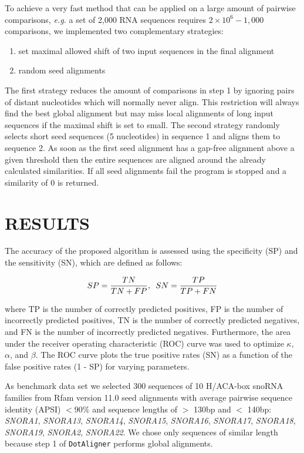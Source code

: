 \documentclass[a4paper,twoside]{article}
\newcommand\dotaligner{\texttt{DotAligner}}
\newcommand\eg{\textit{e.g.}}
\begin{document}
To achieve a very fast method that can be applied on a large amount of pairwise
comparisons, \eg{} a set of 2,000 RNA sequences requires $2 \times 10^6 - 1,000$
comparisons, we implemented two complementary strategies:
\begin{enumerate}
\item set maximal allowed shift of two input sequences in the final alignment
\item random seed alignments
\end{enumerate}
The first strategy reduces the amount of comparisons in step 1 by ignoring pairs
of distant nucleotides which will normally never align. This restriction will
always find the best global alignment but may miss local alignments of long
input sequences if the maximal shift is set to small. The second strategy
randomly selects short seed sequences (5 nucleotides) in sequence 1 and aligns
them to sequence 2. As soon as the first seed alignment has a gap-free alignment
above a given threshold then the entire sequences are aligned around the already
calculated similarities. If all seed alignments fail the program is stopped and
a similarity of 0 is returned.


\section{\uppercase{Results}}

\noindent The accuracy of the proposed algorithm is assessed using the
specificity (SP) and the sensitivity (SN), which are defined as follows:

\begin{equation}\label{eq5}
	SP = \frac{TN}{TN + FP}, \hspace{5px} SN = \frac{TP}{TP + FN}
\end{equation}

where TP is the number of correctly predicted positives, FP is the number of
incorrectly predicted positives, TN is the number of correctly predicted
negatives, and FN is the number of incorrectly predicted negatives.
Furthermore, the area under the receiver operating characteristic (ROC) curve
was used to optimize $\kappa$, $\alpha$, and $\beta$. The ROC curve
plots the true positive rates (SN) as a function of the false positive rates (1
- SP) for varying parameters.

As benchmark data set we selected 300 sequences of 10 H/ACA-box snoRNA families
from Rfam version 11.0 seed alignments with average pairwise sequence identity
(APSI) $< 90\%$ and sequence lengths of $>$ 130bp and $<$ 140bp: \emph{SNORA1},
\emph{SNORA13}, \emph{SNORA14}, \emph{SNORA15}, \emph{SNORA16}, \emph{SNORA17},
\emph{SNORA18}, \emph{SNORA19}, \emph{SNORA2}, \emph{SNORA22}. We chose only
sequences of similar length because step 1 of \dotaligner{} performs global
alignments.
\end{document}
